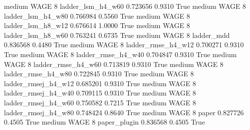     medium     WAGE                 8   ladder_lsm_h4_w60   0.723656      0.9310    True
    medium     WAGE                 8   ladder_lsm_h4_w80   0.766984      0.5560    True
    medium     WAGE                 8   ladder_lsm_h8_w12   0.676614      1.0000    True
    medium     WAGE                 8   ladder_lsm_h8_w60   0.763241      0.6735    True
    medium     WAGE                 8          ladder_mdd   0.836568      0.4480    True
    medium     WAGE                 8  ladder_rmse_h4_w12   0.700271      0.9310    True
    medium     WAGE                 8  ladder_rmse_h4_w40   0.704847      0.9310    True
    medium     WAGE                 8  ladder_rmse_h4_w60   0.713819      0.9310    True
    medium     WAGE                 8  ladder_rmse_h4_w80   0.722845      0.9310    True
    medium     WAGE                 8 ladder_rmsej_h4_w12   0.685201      0.9310    True
    medium     WAGE                 8 ladder_rmsej_h4_w40   0.709115      0.9310    True
    medium     WAGE                 8 ladder_rmsej_h4_w60   0.750582      0.7215    True
    medium     WAGE                 8 ladder_rmsej_h4_w80   0.748424      0.8640    True
    medium     WAGE                 8               paper   0.827726      0.4505    True
    medium     WAGE                 8        paper_plugin   0.836568      0.4505    True